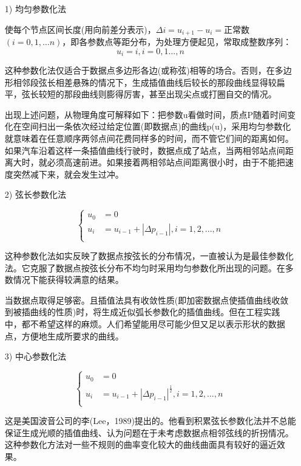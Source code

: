 \documentclass{article}
\begin{document}
	
	\begin{itemize}
		\item [1)] 均匀参数化法
		
		使每个节点区间长度(用向前差分表示)，$\Delta i=u_{i+1}-u_i=$正常数$(i=0,1,…n)$，即各参数点等距分布，为处理方便起见，常取成整数序列：
		$$u_i=i,i=0,1...,n$$
	
		这种参数化法仅适合于数据点多边形各边(或称弦)相等的场合。否则，在多边形相邻段弦长相差悬殊的情况下，生成插值曲线后较长的那段曲线显得较扁平，弦长较短的那段曲线则膨得厉害，甚至出现尖点或打圈自交的情况。
	
	
		出现上述问题，从物理角度可解释如下：把参数u看做时间，质点P随着时间变化在空间扫出一条依次经过给定位置(即数据点)的曲线p(u)，采用均匀参数化就意味着在任意顺序两邻点间花费同样多的时间，而不管它们间的距离如何。如果汽车沿着这样一条插值曲线行驶时，数据点成了站点，当两相邻站点间距离大时，就必须高速前进。如果接着两相邻站点间距离很小时，由于不能把速度突然减下来，就会发生过冲。       
		\item [2)]弦长参数化法
		
		\begin{equation}
			\left\{
			\begin{aligned}
				u_0&=0\\
				u_i&=u_{i-1}+|\Delta p_{i-1}|,i=1,2,...,n\\
			\end{aligned}
			\right.
		\end{equation}
	
		这种参数化法如实反映了数据点按弦长的分布情况，一直被认为是最佳参数化法。它克服了数据点按弦长分布不均匀时采用均匀参数化所出现的问题。在多数情况下能获得较满意的结果。

		
		当数据点取得足够密。且插值法具有收敛性质(即加密数据点使插值曲线收敛到被插曲线的性质)时，将生成近似弧长参数化的插值曲线。但在工程实践中，都不希望这样的麻烦。人们希望能用尽可能少但又足以表示形状的数据点，方便地生成所要求的曲线。
		\item [3)]中心参数化法
		
		\begin{equation}
			\left\{
			\begin{aligned}
				u_0&=0\\
				u_i&=u_{i-1}+|\Delta p_{i-1}|^\frac{1}{2},i=1,2,...,n\\
			\end{aligned}
			\right.
		\end{equation}
	
		这是美国波音公司的李(Lee，1989)提出的。他看到积累弦长参数化法并不总能保证生成光顺的插值曲线、认为问题在于未考虑数据点相邻弦线的折拐情况。这种参数化方法对一些不规则的曲率变化较大的曲线曲面具有较好的逼近效果。
		

\end{itemize}
\end{document}
